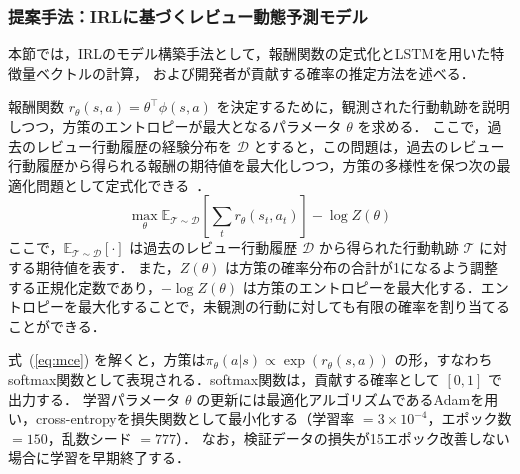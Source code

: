 \documentclass[submit,noauthor,ses,dvipdfmx]{ipsj}
\begin{document}
\subsubsection{提案手法：IRLに基づくレビュー動態予測モデル}\label{sec:irl}

本節では，IRLのモデル構築手法として，報酬関数の定式化とLSTMを用いた特徴量ベクトルの計算，
および開発者が貢献する確率の推定方法を述べる．

報酬関数 $r_\theta(s,a) = \theta^\top \phi(s,a)$ を決定するために，観測された行動軌跡を説明しつつ，方策のエントロピーが最大となるパラメータ $\theta$ を求める．
ここで，過去のレビュー行動履歴の経験分布を $\mathcal{D}$ とすると，この問題は，過去のレビュー行動履歴から得られる報酬の期待値を最大化しつつ，方策の多様性を保つ次の最適化問題として定式化できる~\cite{ziebart}．
\begin{equation}
\max_\theta \mathbb{E}_{\mathcal{T} \sim \mathcal{D}}
\left[\sum_t r_\theta(s_t, a_t)\right] - \log Z(\theta)
\label{eq:mce}
\end{equation}
ここで，$\mathbb{E}_{\mathcal{T} \sim \mathcal{D}}[\cdot]$ は過去のレビュー行動履歴 $\mathcal{D}$ から得られた行動軌跡 $\mathcal{T}$ に対する期待値を表す．
また，$Z(\theta)$ は方策の確率分布の合計が1になるよう調整する正規化定数であり，$-\log Z(\theta)$ は方策のエントロピーを最大化する．エントロピーを最大化することで，未観測の行動に対しても有限の確率を割り当てることができる．

式~(\ref{eq:mce}) を解くと，方策は$\pi_\theta(a|s) \propto \exp(r_\theta(s,a))$ の形，すなわちsoftmax関数として表現される．softmax関数は，貢献する確率として $[0, 1]$ で出力する．
学習パラメータ $\theta$ の更新には最適化アルゴリズムであるAdam\cite{adam}を用い，cross-entropyを損失関数として最小化する（学習率 $= 3\times10^{-4}$，エポック数 $= 150$，乱数シード $= 777$）．
なお，検証データの損失が15エポック改善しない場合に学習を早期終了する．





\end{document}
